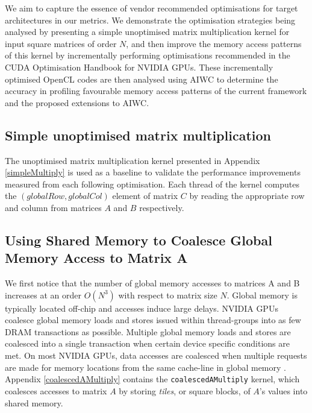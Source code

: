 \documentclass[review=false, sigchi]{acmart}
\begin{document}
	We aim to capture the essence of vendor recommended optimisations for target architectures in our metrics. We demonstrate the optimisation strategies being analysed by presenting a simple unoptimised matrix multiplication kernel for input square matrices of order $N$, and then improve the memory access patterns of this kernel by incrementally performing optimisations recommended in the CUDA Optimisation Handbook \cite{cudaoptimisation} for NVIDIA GPUs. These incrementally optimised OpenCL codes are then analysed using AIWC to determine the accuracy in profiling favourable memory access patterns of the current framework and the proposed extensions to AIWC.
	
	\subsection{Simple unoptimised matrix multiplication}
	
	The unoptimised matrix multiplication kernel presented in Appendix \ref{simpleMultiply} is used as a baseline to validate the performance improvements measured from each following optimisation. Each thread of the kernel computes the $(globalRow, globalCol)$ element of matrix $C$ by reading the appropriate row and column from matrices $A$ and $B$ respectively.
	
	\subsection{Using Shared Memory to Coalesce Global Memory Access to Matrix A} 
	
	We first notice that the number of global memory accesses to matrices A and B increases at an order $O(N^3)$ with respect to matrix size $N$. Global memory is typically located off-chip and accesses induce large delays. NVIDIA GPUs coalesce global memory loads and stores issued within thread-groups into as few DRAM transactions as possible. Multiple global memory loads and stores are coalesced into a single transaction when certain device specific conditions are met. On most NVIDIA GPUs, data accesses are coalesced when multiple requests are made for memory locations from the same cache-line in global memory \cite{cudamanual}. Appendix \ref{coalescedAMultiply} contains the \texttt{coalescedAMultiply} kernel, which coalesces accesses to matrix $A$ by storing \emph{tiles}, or square blocks, of $A$'s values into shared memory. 
	
	
\end{document}
